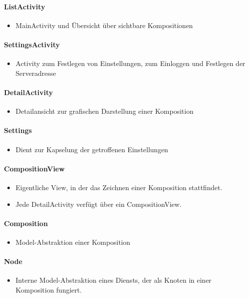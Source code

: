 \paragraph{ListActivity}
\begin{itemize}
	\item MainActivity und Übersicht über sichtbare Kompositionen 
\end{itemize}
\paragraph{SettingsActivity}
\begin{itemize} 
	\item Activity zum Festlegen von Einstellungen, zum Einloggen und Festlegen der Serveradresse 
\end{itemize} 
\paragraph{DetailActivity}
\begin{itemize}
	\item Detailansicht zur grafischen Darstellung einer Komposition 
\end{itemize}
\paragraph{Settings} 
\begin{itemize}		
	\item Dient zur Kapselung der getroffenen Einstellungen 
\end{itemize}
\paragraph{CompositionView}
\begin{itemize}
	\item Eigentliche View, in der das Zeichnen einer Komposition stattfindet. 
	\item Jede DetailActivity verfügt über ein CompositionView. 
\end{itemize}
\paragraph{Composition}
\begin{itemize}
	\item Model-Abstraktion einer Komposition 
\end{itemize}
\paragraph{Node}
\begin{itemize}
	\item Interne Model-Abstraktion eines Diensts, der als Knoten in einer Komposition fungiert. 
\end{itemize}
